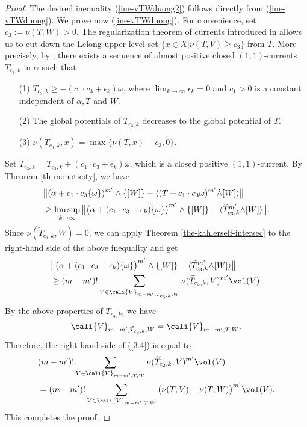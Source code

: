    \begin{proof} The desired inequality (\ref{ine-vTWduong2}) follows directly from (\ref{ine-vTWduong}). We prove now (\ref{ine-vTWduong}). For convenience, set $c_3 := \nu(T,W)>0$. The regularization theorem of currents introduced in \cite{Demailly_regula_11current} allows us to cut down the Lelong upper level set $\{x \in X | \nu (T,V) \geq c_3\}$ from $T$. More precisely, by \cite[Theorem 1.1]{Demailly_regula_11current}, there exists a sequence 
    of almost positive closed $(1,1)$-currents $T_{c_3,k}$ in $\alpha$ such that 
    \begin{itemize}
        \item[(1)] $T_{c_3,k} \geq -(c_1 \cdot c_3 + \epsilon_k) \omega$, where $\lim_{k \rightarrow \infty }\epsilon_k =0$ and $c_1>0$ is a constant independent of $\alpha, T$ and $W$. 
        \item[(2)] The global potentials of $T_{c_3,k}$ decreases to the global potential of $T$.
        \item[(3)] $\nu(T_{c_3,k},x) = \max\{ \nu(T,x)-c_3,0\}$.
    \end{itemize}
    Set $\widetilde{T}_{c_3,k}= T_{c_3,k}+ (c_1 \cdot c_3 + \epsilon_k) \omega$, which is a closed positive $(1,1)$-current. By Theorem \ref{th-monoticity}, we have 
    \begin{align*}
        &\big{\|}(\alpha+ c_1 \cdot c_3 \{\omega\})^{m'} \wedge \{[W]\} - \langle (T+ c_1 \cdot c_3 \omega)^{m'} \dot{\wedge} [W] \rangle \big{\|}\\
        &\geq \limsup_{k \rightarrow \infty} \big{\|}\big{(}\alpha+ (c_1 \cdot c_3+\epsilon_{k}) \{\omega\}\big{)}^{m'} \wedge \{[W]\} - \langle \widetilde{T}_{c_3,k}^{m'}\dot{\wedge} [W] \rangle \big{\|}.
    \end{align*}
    Since $\nu(\widetilde{T}_{c_3,k},W)=0$, we can apply Theorem \ref{the-kahlerself-intersec} to the right-hand side of the above inequality and get 
        \begin{align}
        &\big{\|}\big{(}\alpha+ (c_1 \cdot c_3+\epsilon_{k}) \{\omega\}\big{)}^{m'} \wedge \{[W]\} - \langle \widetilde{T}_{c_3,k}^{m'}\dot{\wedge} [W] \rangle \big{\|} \notag \\
        &\geq (m-m')!\sum_{V \in \cali{V}_{m-m',\tilde{T}_{c_3,k},W}} \nu(\widetilde{T}_{c_3,k},V)^{m'} \vol(V), \label{3.4}
    \end{align}
    By the above properties of $T_{c_3,k}$, we have
    \[
       \cali{V}_{m-m',\tilde{T}_{c_3,k},W} = \cali{V}_{m-m',T,W}.
    \]
    Therefore, the right-hand side of  (\ref{3.4}) is equal to
    \begin{align*}
        &(m-m')!\sum_{V \in \cali{V}_{m-m',T,W}} \nu(\widetilde{T}_{c_2,k},V)^{m'} \vol(V)\\
        &= (m-m')!\sum_{V \in \cali{V}_{m-m',T,W}} \big( \nu(T,V) -\nu(T,W) \big)^{m'}\vol(V).
    \end{align*}
    This completes the proof.
    \end{proof}



